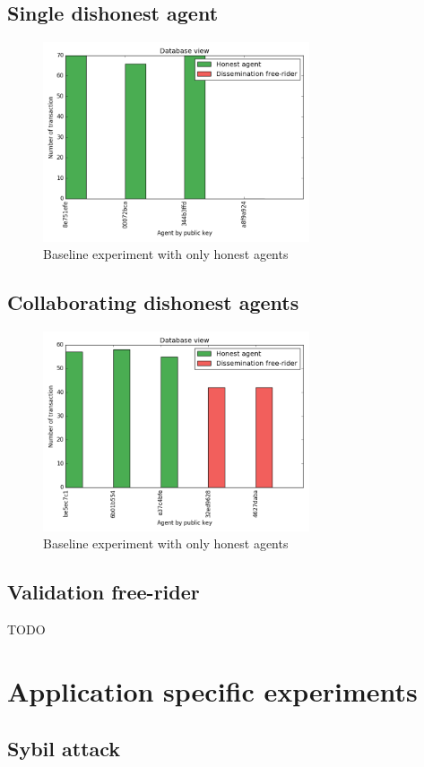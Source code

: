 \subsection{Single dishonest agent}

\begin{figure}[h!]
    \centering
    \includegraphics[width=0.7\textwidth]{images/single_dis_free_rider}
    \caption{Baseline experiment with only honest agents}
    \label{baseline_honest}
\end{figure}

\subsection{Collaborating dishonest agents}

\begin{figure}[h!]
    \centering
    \includegraphics[width=0.7\textwidth]{images/multi_dis_free_rider}
    \caption{Baseline experiment with only honest agents}
    \label{baseline_honest}
\end{figure}

\subsection{Validation free-rider}
{\color{red} TODO}

\section{Application specific experiments}

\subsection{Sybil attack}